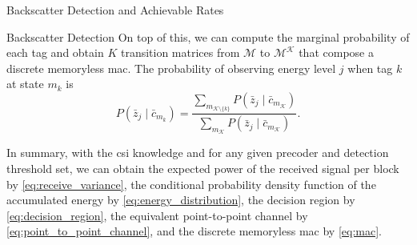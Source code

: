 \documentclass[journal]{IEEEtran}
\begin{document}
\begin{section}{Backscatter Detection and Achievable Rates}
\begin{subsection}{Backscatter Detection}
			On top of this, we can compute the marginal probability of each tag and obtain $K$ transition matrices from $\mathcal{M}$ to $\mathcal{M^K}$ that compose a discrete memoryless \gls{mac}. The probability of observing energy level $j$ when tag $k$ at state $m_k$ is
			\begin{equation}
				P(\bar{z}_j \mid \bar{c}_{m_k}) = \frac{\sum_{m_{\mathcal{K} \setminus \{k\}}} P(\bar{z}_j \mid \bar{c}_{m_{\mathcal{K}}})}{\sum_{m_{\mathcal{K}}} P(\bar{z}_j \mid \bar{c}_{m_{\mathcal{K}}})}.
				\label{eq:mac}
			\end{equation}

			In summary, with the \gls{csi} knowledge and for any given precoder and detection threshold set, we can obtain the expected power of the received signal per block by \eqref{eq:receive_variance}, the conditional probability density function of the accumulated energy by \eqref{eq:energy_distribution}, the decision region by \eqref{eq:decision_region}, the equivalent point-to-point channel by \eqref{eq:point_to_point_channel}, and the discrete memoryless \gls{mac} by \eqref{eq:mac}.
		\end{subsection}


\end{section}
\end{document}
